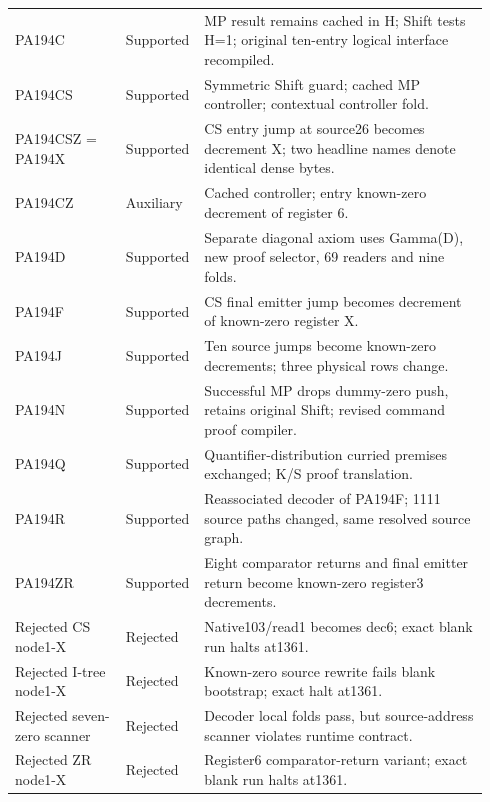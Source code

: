 {\begin{longtable}{@{}p{0.23\linewidth}p{0.12\linewidth}p{0.59\linewidth}@{}}
PA194C & Supported & MP result remains cached in H; Shift tests H=1; original ten-entry logical interface recompiled.\\[4pt]
PA194CS & Supported & Symmetric Shift guard; cached MP controller; contextual controller fold.\\[4pt]
PA194CSZ = PA194X & Supported & CS entry jump at source26 becomes decrement X; two headline names denote identical dense bytes.\\[4pt]
PA194CZ & Auxiliary & Cached controller; entry known-zero decrement of register 6.\\[4pt]
PA194D & Supported & Separate diagonal axiom uses Gamma(D), new proof selector, 69 readers and nine folds.\\[4pt]
PA194F & Supported & CS final emitter jump becomes decrement of known-zero register X.\\[4pt]
PA194J & Supported & Ten source jumps become known-zero decrements; three physical rows change.\\[4pt]
PA194N & Supported & Successful MP drops dummy-zero push, retains original Shift; revised command proof compiler.\\[4pt]
PA194Q & Supported & Quantifier-distribution curried premises exchanged; K/S proof translation.\\[4pt]
PA194R & Supported & Reassociated decoder of PA194F; 1111 source paths changed, same resolved source graph.\\[4pt]
PA194ZR & Supported & Eight comparator returns and final emitter return become known-zero register3 decrements.\\[4pt]
Rejected CS node1-X & Rejected & Native103/read1 becomes dec6; exact blank run halts at1361.\\[4pt]
Rejected I-tree node1-X & Rejected & Known-zero source rewrite fails blank bootstrap; exact halt at1361.\\[4pt]
Rejected seven-zero scanner & Rejected & Decoder local folds pass, but source-address scanner violates runtime contract.\\[4pt]
Rejected ZR node1-X & Rejected & Register6 comparator-return variant; exact blank run halts at1361.\\[4pt]
\end{longtable}}

